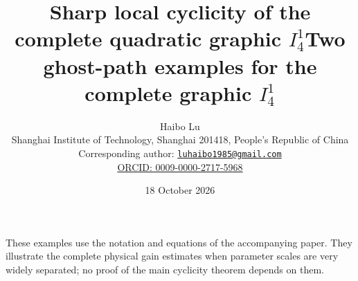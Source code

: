 \documentclass[a4paper,11pt]{article}
\title{Sharp local cyclicity of the complete quadratic graphic $I_4^1$}
\author{Haibo Lu\\
\small Shanghai Institute of Technology, Shanghai 201418, People's Republic of China\\
\small Corresponding author: \href{mailto:luhaibo1985@gmail.com}{\texttt{luhaibo1985@gmail.com}}\\
\small \href{https://orcid.org/0009-0000-2717-5968}{ORCID: 0009-0000-2717-5968}}
\date{18 October 2026}
\title{Two ghost-path examples for the complete graphic $I_4^1$}
\date{}
\numberwithin{equation}{section}
\theoremstyle{definition}
\theoremstyle{remark}
\begin{document}
\maketitle
These examples use the notation and equations of the accompanying
paper. They illustrate the complete physical gain estimates when
parameter scales are very widely separated; no proof of the main
cyclicity theorem depends on them.

\end{document}

